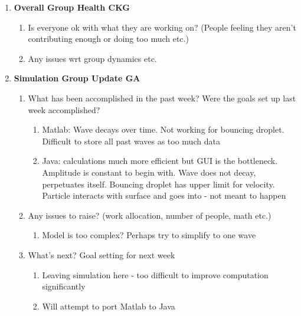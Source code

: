 \begin{enumerate}
\item  \textbf{Overall Group Health CKG}

\begin{enumerate}
\item Is everyone ok with what they are working on? (People feeling they aren't contributing enough or doing too much etc.)

\item  Any issues wrt group dynamics etc.
\vspace{5mm}

\end{enumerate}

\item  \textbf{Simulation Group Update GA}

\begin{enumerate}
\item What has been accomplished in the past week? Were the goals set up last week accomplished?

\begin{enumerate}
\item  Matlab: Wave decays over time. Not working for bouncing droplet. Difficult to store all past waves as too much data

\item  Java: calculations much more efficient but GUI is the bottleneck. Amplitude is constant to begin with. Wave does not decay, perpetuates itself. Bouncing droplet has upper limit for velocity. Particle interacts with surface and goes into - not meant to happen
\end{enumerate}

\item  Any issues to raise? (work allocation, number of people,  math etc.)

\begin{enumerate}
\item  Model is too complex? Perhaps try to simplify to one wave
\end{enumerate}

\item  What's next? Goal setting for next week

\begin{enumerate}
\item  Leaving simulation here - too difficult to improve computation significantly

\item  Will attempt to port Matlab to Java


\end{enumerate}
\end{enumerate}
\end{enumerate}
